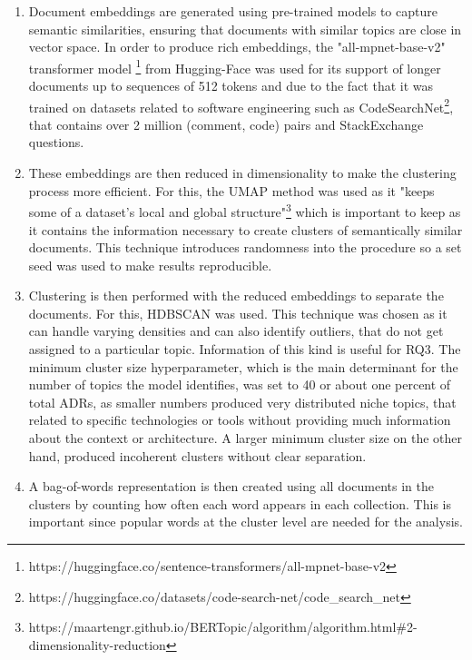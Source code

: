        \begin{enumerate}
            \item Document embeddings are generated using pre-trained models to capture semantic similarities, ensuring that documents with similar topics are close in vector space. In order to produce rich embeddings, the "all-mpnet-base-v2" transformer model \footnote{https://huggingface.co/sentence-transformers/all-mpnet-base-v2} from Hugging-Face was used for its support of longer documents up to sequences of 512 tokens and due to the fact that it was trained on datasets related to software engineering such as CodeSearchNet\footnote{https://huggingface.co/datasets/code-search-net/code\_search\_net}, that contains over 2 million (comment, code) pairs and StackExchange questions.
            
            \item These embeddings are then reduced in dimensionality to make the clustering process more efficient. For this, the UMAP method was used as it "keeps some of a dataset's local and global structure"\footnote{https://maartengr.github.io/BERTopic/algorithm/algorithm.html\#2-dimensionality-reduction} which is important to keep as it contains the information necessary to create clusters of semantically similar documents. This technique introduces randomness into the procedure so a set seed was used to make results reproducible.

            \item Clustering is then performed with the reduced embeddings to separate the documents. For this, HDBSCAN was used. This technique was chosen as it can handle varying densities and can also identify outliers, that do not get assigned to a particular topic. Information of this kind is useful for RQ3. The minimum cluster size hyperparameter, which is the main determinant for the number of  topics the model identifies, was set to 40 or about one percent of total ADRs, as smaller numbers produced very distributed niche topics, that related to specific technologies or tools without providing much information about the context or architecture. A larger minimum cluster size on the other hand, produced incoherent clusters without clear separation.

            \item A bag-of-words representation is then created using all documents in the clusters by counting how often each word appears in each collection. This is important since popular words at the cluster level are needed for the analysis. 


\end{enumerate}
